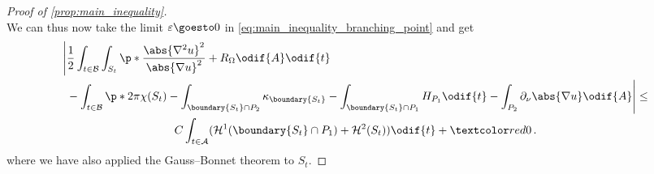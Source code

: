 \documentclass[titlepage,numbers=noenddot,oneside,%
cleardoublepage=empty,paper=a4,fontsize=11pt,%
english,%
]{scrartcl}
\newcommand*{\mathcomma}{\,,}
\newcommand*{\mathfullstop}{\,.}
\begin{document}
{\begin{proof}[Proof of \cref{prop:main_inequality}]
\begin{equation*}
            \end{equation*}
            We can thus now take the limit \( \varepsilon\goesto 0 \) in \cref{eq:main_inequality_branching_point} and get
            \begin{multline}
                \begin{aligned}[b]
                    \Bigg\lvert & \frac{1}{2}\int_{t\in \mathcal{B}}\int_{S_t}\p*{\frac{\abs{\nabla^2 u}^2}{\abs{\nabla u}^2}+R_{\Omega}}\odif{A}\odif{t}                                                                                   \\
                    {}          & -\int_{t\in \mathcal{B}}\p*{2\pi \chi(S_t)-\int_{\boundary{S_t}\cap P_2}\kappa_{\boundary{S_t}}-\int_{\boundary{S_t}\cap P_1}H_{P_1}} \odif{t}-\int_{P_2}\partial_{\nu}\abs{\nabla u}\odif{A}\Bigg\rvert
                \end{aligned}\leq \\
                C\int_{t\in \mathcal{A}}(\mathcal{H}^1(\boundary{S_t}\cap P_1)+\mathcal{H}^2(S_t))\odif{t}+\additionalTerms{0}\mathfullstop\label{eq:inequality_with_critical_values_removed}
            \end{multline}
            where we have also applied the Gauss--Bonnet theorem to \( S_t \).
            

\end{proof}}
\end{document}
